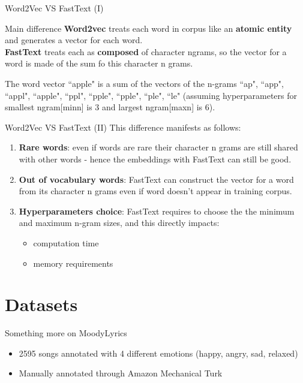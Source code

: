 \documentclass[xcolor=dvipsnames]{beamer}
\begin{document}
\begin{frame}{Word2Vec VS FastText (I)}
\begin{block}{Main difference}
\textbf{Word2vec} treats each word in corpus like an \textbf{atomic entity} and generates a vector for each word.\\
\textbf{FastText} treats each as \textbf{composed} of character ngrams, so the vector for a word is made of the sum fo this character n grams.
\end{block}
\begin{Example}
 The word vector ``apple" is a sum of the vectors of the n-grams ``ap", ``app", ``appl", ``apple", ``ppl", ``pple", ``pple", ``ple", ``le" (assuming hyperparameters for smallest ngram[minn] is 3 and largest ngram[maxn] is 6).
\end{Example}
\end{frame}
\begin{frame}{Word2Vec VS FastText (II)}
This difference manifests as follows:
\begin{enumerate}
\item \textbf{Rare words}: even if words are rare their character n grams are still shared with other words - hence the embeddings with FastText can still be good.
\item \textbf{Out of vocabulary words}: FastText can construct the vector for a word from its character n grams even if word doesn't appear in training corpus.
\item \textbf{Hyperparameters choice}: FastText requires to choose the the minimum and maximum n-gram sizes, and this directly impacts:
	\begin{itemize}
	\item computation time
	\item memory requirements
	\end{itemize}

\end{enumerate}
\end{frame}

\section{Datasets}
\begin{frame}{Something more on MoodyLyrics \cite{p9}}
\begin{itemize}
\item 2595 songs annotated with 4 different emotions (happy, angry, sad, relaxed)
\item Manually annotated through Amazon Mechanical Turk
\end{itemize}
\end{frame}
\end{document}
